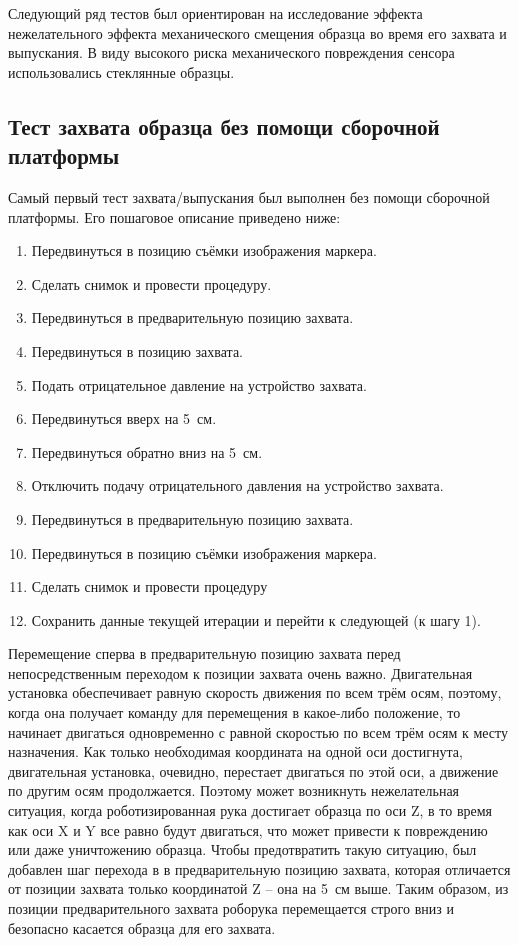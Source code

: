 Следующий ряд тестов был ориентирован на исследование эффекта нежелательного эффекта механического смещения образца во время его захвата и выпускания. В виду высокого риска механического повреждения сенсора использовались стеклянные образцы.

\subsection{Тест захвата образца без помощи сборочной платформы}

Самый первый тест захвата/выпускания был выполнен без помощи сборочной платформы. Его пошаговое описание приведено ниже:

\begin{enumerate}
\setlength\itemsep{-0.5em}
\item Передвинуться в позицию съёмки изображения маркера.
\item Сделать снимок и провести процедуру.
\item Передвинуться в предварительную позицию захвата.
\item Передвинуться в позицию захвата.
\item Подать отрицательное давление на устройство захвата.
\item Передвинуться вверх на 5~см.
\item Передвинуться обратно вниз на 5~см.
\item Отключить подачу отрицательного давления на устройство захвата.
\item Передвинуться в предварительную позицию захвата.
\item Передвинуться в позицию съёмки изображения маркера.
\item Сделать снимок и провести процедуру
\item Сохранить данные текущей итерации и перейти к следующей (к шагу 1).
\end{enumerate}

Перемещение сперва в предварительную позицию захвата перед непосредственным переходом к позиции захвата очень важно. Двигательная установка обеспечивает равную скорость движения по всем трём осям, поэтому, когда она получает команду для перемещения в какое-либо положение, то начинает двигаться одновременно с равной скоростью по всем трём осям к месту назначения. Как только необходимая координата на одной оси достигнута, двигательная установка, очевидно, перестает двигаться по этой оси, а движение по другим осям продолжается. Поэтому может возникнуть нежелательная ситуация, когда роботизированная рука достигает образца по оси Z, в то время как оси X и Y все равно будут двигаться, что может привести к повреждению или даже уничтожению образца. Чтобы предотвратить такую ситуацию, был добавлен шаг перехода в в предварительную позицию захвата, которая отличается от позиции захвата только координатой Z -- она на 5~см выше. Таким образом, из позиции предварительного захвата роборука перемещается строго вниз и безопасно касается образца для его захвата.

